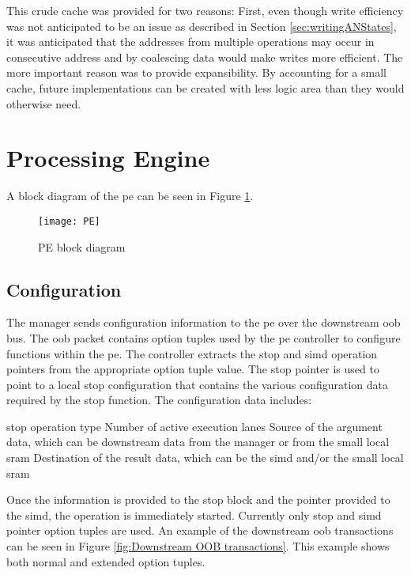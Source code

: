 This crude cache was provided for two reasons: First, even though write efficiency was not anticipated to be an issue as described in Section \ref{sec:writingANStates}, it was anticipated that the addresses from multiple operations may occur in consecutive address and by coalescing data would make writes more efficient.
The more important reason was to provide expansibility. By accounting for a small cache, future implementations can be created with less logic area than they would otherwise need.


\section{Processing Engine}
\label{sec:pe}

A block diagram of the \ac{pe} can be seen in Figure \ref{fig:PE block diagram}.
\begin{figure}[h]
\centering
\captionsetup{justification=centering}
\captionsetup{width=.9\linewidth}
\centerline{
\mbox{\texttt{[image: PE]}}
}
\center\caption{PE block diagram}
\label{fig:PE block diagram}
\end{figure}

\subsection{Configuration}
\label{sec:peConfiguration}

The manager sends configuration information to the \ac{pe} over the downstream \ac{oob} bus.
The \ac{oob} packet contains option tuples used by the \ac{pe} controller to configure functions within the \ac{pe}.
The controller extracts the \ac{stop} and \ac{simd} operation pointers from the appropriate option tuple value.
The \ac{stop} pointer is used to point to a local \ac{stop} configuration that contains the various configuration data required by the \ac{stop} function.
The configuration data includes:
\begin{outline}
    \1 \ac{stop} operation type
    \1 Number of active execution lanes
    \1 Source of the argument data, which can be downstream data from the manager or from the small local \ac{sram}
    \1 Destination of the result data, which can be the \ac{simd} and/or the small local \ac{sram}
\end{outline}
Once the information is provided to the \ac{stop} block and the pointer provided to the \ac{simd}, the operation is immediately started.
Currently only \ac{stop} and \ac{simd} pointer option tuples are used.
An example of the downstream \ac{oob} transactions can be seen in Figure \ref{fig:Downstream OOB transactions}. This example shows both normal and extended option tuples.

